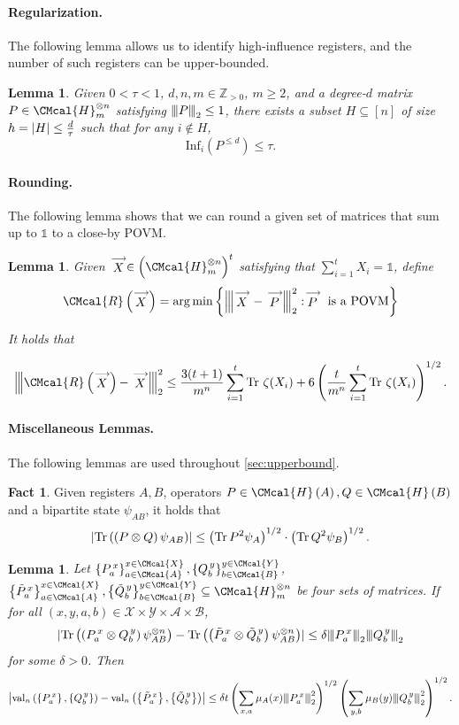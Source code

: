 \documentclass[11pt]{article}
\def\A{\CMcal{A}}
\def\B{\CMcal{B}}
\def\H{\CMcal{H}}
\def\R{\CMcal{R}}
\def\X{\CMcal{X}}
\def\Y{\CMcal{Y}}
\theoremstyle{plain}
\newtheorem{lemma}[theorem]{Lemma}
\theoremstyle{definition}
\newtheorem{fact}[theorem]{Fact}
\newcommand {\set} [1] {\ensuremath{ \left\lbrace #1 \right\rbrace }}
\newcommand {\br} [1] {\ensuremath{ \left( #1 \right) }}
\newcommand {\ab} [1] {\ensuremath{ \left| #1 \right| }}
\DeclarePairedDelimiter{\abs}{\lvert}{\rvert}
\newcommand{\nnorm}[1]{{\left\vert\kern-0.25ex\left\vert\kern-0.25ex\left\vert #1
		\right\vert\kern-0.25ex\right\vert\kern-0.25ex\right\vert}}
\newcommand {\Tr} {\ensuremath{ \mathrm{Tr} }}
\newcommand {\id} {\ensuremath{\mathds{1}}}
\renewcommand{\vec}[1]{\stackrel{\longrightarrow}{#1}}
\newcommand{\posint}{{\mathbb Z}_{>0}}
\newcommand{\herspace}[1]{\ensuremath{\H_m^{\otimes #1}}}
\newcommand{\infi}[1]{\ensuremath{\mathrm{Inf}_i}\br{#1}}
\newcommand{\gval}[3]{\ensuremath{\mathrm{val}_{#1}\br{\set{#2},\set{#3}}}}
\newcommand{\fourtuples}{\ensuremath{\br{x,y,a,b}\in\calX\times\calY\times\calA\times\calB}}
\newcommand{\Pss} {\ensuremath{P^{\,x}_a}}
\newcommand{\Qss} {\ensuremath{Q^{\,y}_b}}
\newcommand{\Pwss} {\ensuremath{\tilde{P}^{\,x}_a}}
\newcommand{\Qwss} {\ensuremath{\tilde{Q}^{\,y}_b}}
\newcommand{\calX}{\mathcal{X}}
\newcommand{\calY}{\mathcal{Y}}
\newcommand{\calA}{\mathcal{A}}
\newcommand{\calB}{\mathcal{B}}
\newcommand{\1}{\mathbb{1}} %
\begin{document}
\paragraph*{Regularization.} The following lemma allows us to identify high-influence registers,
and the number of such registers can be upper-bounded.


\begin{lemma}\label{lem:regular}\cite[Lemma 7.4]{qin2021nonlocal}
	Given $0<\tau<1$, $d,n,m\in\posint$, $m\geq2$, and a degree-$d$ matrix $P\in\H_m^{\otimes n}$ satisfying $\nnorm{P}_2\leq1$, there exists a subset $H\subseteq[n]$ of size $h=\abs{H}\leq\frac{d}{\tau}$ such that for any $i\notin H$,
$$\infi{P^{\leq d}}\leq\tau.$$ 
\end{lemma}



\paragraph*{Rounding.} The following lemma shows that we can round a given set of matrices that sum up to $\id$
to a close-by POVM.
\begin{lemma}\label{lem:closedelta}
	Given $\vec{X}\in\br{\H_m^{\otimes n}}^t$ satisfying that $\sum_{i=1}^tX_i=\id$, define
	$$\R\br{\vec{X}}=\arg\min\set{\nnorm{\vec{X}-\vec{P}}_2^2:\vec{P}~\mbox{is a POVM}}$$
	
	It holds that
	
	$$\nnorm{\R\br{\vec{X}}-\vec{X}}_2^2\leq\frac{3(t+1)}{m^n}\sum_{i=1}^t\Tr~\zeta(X_i)+6\br{\frac{t}{m^n}\sum_{i=1}^t\Tr~\zeta(X_i)}^{1/2}.$$
\end{lemma}

\paragraph*{Miscellaneous Lemmas.} The following lemmas are used throughout \cref{sec:upperbound}.

	\begin{fact}\label{fac:cauchyschwartz}\cite[Fact 2.1]{qin2021nonlocal}
		Given registers $A, B$, operators $P\in\H\br{A}, Q\in\H\br{B}$ and a bipartite state $\psi_{AB}$, it holds that
		\[\abs{\Tr\br{\br{P\otimes Q}\psi_{AB}}}\leq\br{\Tr \,P^2\psi_A}^{1/2}\cdot\br{\Tr \,Q^2\psi_B}^{1/2}.\]
	\end{fact}

\begin{lemma}\label{lem:maincauchy}
Let $\set{\Pss}^{x\in\X}_{a\in\A},\set{\Qss}^{y\in\Y}_{b\in\B}$, $\set{\Pwss}^{x\in\X}_{a\in\A},\set{\Qwss}^{y\in\Y}_{b\in\B}\subseteq\herspace{n}$ be four sets of matrices. If for all \fourtuples, 
\[\abs{\Tr\br{\br{\Pss\otimes \Qss}\psi_{AB}^{\otimes n}}-\Tr\br{\br{\Pwss\otimes \Qwss}\psi_{AB}^{\otimes n}}}\leq\delta\nnorm{\Pss}_2\nnorm{\Qss}_2\]
for some $\delta>0$. 
Then
\[\ab{\gval{n}{\Pss}{\Qss}-\gval{n}{\Pwss}{\Qwss}}\leq\delta t\br{\sum_{x,a}\mu_A(x)\nnorm{\Pss}_2^2}^{1/2}\br{\sum_{y,b}\mu_B(y)\nnorm{\Qss}_2^2}^{1/2}.\]
\end{lemma}
\end{document}
